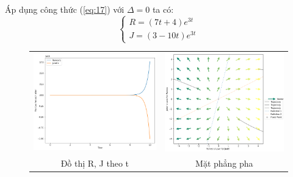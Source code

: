 \documentclass[a4paper]{article}
\begin{document}
\begin{enumerate}
\begin{itemize}
    Áp dụng công thức (\ref{eq:17}) với $\Delta = 0$ ta có:
    $$\begin{cases}
        R = (7t+4)e^{3t}\\
        J = (3-10t)e^{3t}
    \end{cases}$$
    \begin{figure}[htp]
        \centering
        \begin{tabular}{cc}
            \includegraphics[scale = .33]{Images/Bt2/3.2_gr.png} &
            \includegraphics[scale = .33]{Images/Bt2/3.2_phase.png} \\
            Đồ thị R, J theo t & Mặt phẳng pha

\end{tabular}
\end{figure}
\end{itemize}
\end{enumerate}
\end{document}
